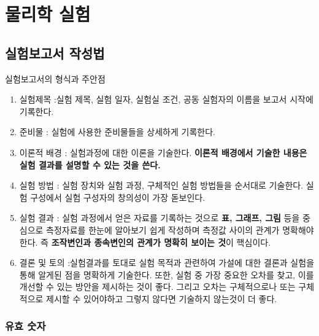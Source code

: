 

\chapter{물리학 실험}\label{chap:Experiment in physics}

\begin{flushleft}
\section{실험보고서 작성법}
\begin{exper}{ \Large {실험보고서의 형식과 주안점} }
  \begin{enumerate}[(1)]\setlength{\itemsep}{10mm}
    \item 실험제목 :실험 제목, 실험 일자, 실험실 조건, 공동 실험자의 이름을 보고서 시작에 기록한다.

    \item 준비물 : 실험에 사용한 준비물들을 상세하게 기록한다. 

    \item 이론적 배경 : 실험과정에 대한 이론을 기술한다. \textbf{이론적 배경에서 기술한 내용은 실험 결과를 설명할 수 있는 것을 쓴다.}
   
    \item 실험 방법 : 실험 장치와 실험 과정, 구체적인 실험 방법들을 순서대로 기술한다. 실험 구성에서 실험 구성자의 창의성이 가장 돋보인다.
   
    \item 실험 결과 : 실험 과정에서 얻은 자료를 기록하는 것으로 \textbf{표, 그래프, 그림} 등을 중심으로 측정자료를 한눈에 알아보기 쉽게 작성하며
    측정값 사이의 관계가 명확해야한다. 즉 \textbf{조작변인과 종속변인의 관계가 명확히 보이는 것}이 핵심이다. 

    \item 결론 및 토의 :실험결과를 토대로 실험 목적과 관련하여 가설에 대한 결론과 실험을 통해 알게된 점을 명확하게 기술한다. 또한, 실험 중 
    가장 중요한 오차를 찾고, 이를 개선할 수 있는 방안을 제시하는 것이 좋다. 그리고 오차는 구체적으로나 또는 구체적으로 제시할 수 있어야하고
    그렇지 않다면 기술하지 않는것이 더 좋다. 

\end{enumerate}
\end{exper}

\subsection{유효 숫자}




\end{flushleft}
